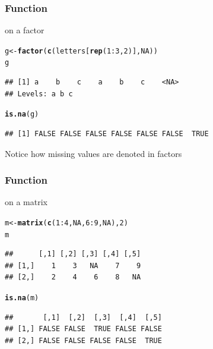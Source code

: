 \documentclass[12pt]{beamer}\usepackage[]{graphicx}\usepackage[]{color}
\makeatletter
\newcommand{\hlnum}[1]{\textcolor[rgb]{0.686,0.059,0.569}{#1}}%
\newcommand{\hlopt}[1]{\textcolor[rgb]{0,0,0}{#1}}%
\newcommand{\hlstd}[1]{\textcolor[rgb]{0.345,0.345,0.345}{#1}}%
\newcommand{\hlkwb}[1]{\textcolor[rgb]{0.69,0.353,0.396}{#1}}%
\newcommand{\hlkwd}[1]{\textcolor[rgb]{0.737,0.353,0.396}{\textbf{#1}}}%
\newenvironment{kframe}{%
 \def\at@end@of@kframe{}%
 \ifinner\ifhmode%
  \def\at@end@of@kframe{\end{minipage}}%
  \begin{minipage}{\columnwidth}%
 \fi\fi%
 \def\FrameCommand##1{\hskip\@totalleftmargin \hskip-\fboxsep
 \colorbox{shadecolor}{##1}\hskip-\fboxsep
     \hskip-\linewidth \hskip-\@totalleftmargin \hskip\columnwidth}%
 \MakeFramed {\advance\hsize-\width
   \@totalleftmargin\z@ \linewidth\hsize
   \@setminipage}}%
 {\par\unskip\endMakeFramed%
 \at@end@of@kframe}
\newenvironment{knitrout}{}{} %
\makeatother
\begin{document}

\begin{frame}[fragile]
\frametitle{Function }

 on a factor
\begin{knitrout}\footnotesize
{}\color{fgcolor}\begin{kframe}
\begin{alltt}
\hlstd{g} \hlkwb{<-} \hlkwd{factor}\hlstd{(}\hlkwd{c}\hlstd{(letters[}\hlkwd{rep}\hlstd{(}\hlnum{1}\hlopt{:}\hlnum{3}\hlstd{,} \hlnum{2}\hlstd{)],} \hlnum{NA}\hlstd{))}
\hlstd{g}
\end{alltt}
\begin{verbatim}
## [1] a    b    c    a    b    c    <NA>
## Levels: a b c
\end{verbatim}
\begin{alltt}
\hlkwd{is.na}\hlstd{(g)}
\end{alltt}
\begin{verbatim}
## [1] FALSE FALSE FALSE FALSE FALSE FALSE  TRUE
\end{verbatim}
\end{kframe}
\end{knitrout}

{\footnotesize Notice how missing values are denoted in factors}

\end{frame}


\begin{frame}[fragile]
\frametitle{Function }

 on a matrix
\begin{knitrout}\footnotesize
{}\color{fgcolor}\begin{kframe}
\begin{alltt}
\hlstd{m} \hlkwb{<-} \hlkwd{matrix}\hlstd{(}\hlkwd{c}\hlstd{(}\hlnum{1}\hlopt{:}\hlnum{4}\hlstd{,} \hlnum{NA}\hlstd{,} \hlnum{6}\hlopt{:}\hlnum{9}\hlstd{,} \hlnum{NA}\hlstd{),} \hlnum{2}\hlstd{)}
\hlstd{m}
\end{alltt}
\begin{verbatim}
##      [,1] [,2] [,3] [,4] [,5]
## [1,]    1    3   NA    7    9
## [2,]    2    4    6    8   NA
\end{verbatim}
\begin{alltt}
\hlkwd{is.na}\hlstd{(m)}
\end{alltt}
\begin{verbatim}
##       [,1]  [,2]  [,3]  [,4]  [,5]
## [1,] FALSE FALSE  TRUE FALSE FALSE
## [2,] FALSE FALSE FALSE FALSE  TRUE
\end{verbatim}
\end{kframe}
\end{knitrout}

\end{frame}
\end{document}
